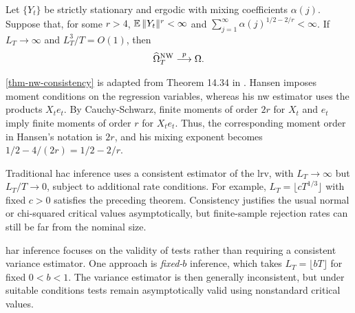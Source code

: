 \documentclass[a4paper,12pt]{article}
\begin{document}
\begin{theorem}\label{thm-nw-consistency}
	Let $\{Y_t\}$ be strictly stationary and ergodic with mixing coefficients $\alpha(j)$.
	Suppose that, for some $r>4$,
	$\operatorname{\mathbb{E}}\|Y_t\|^r<\infty$ and
	$\sum_{j=1}^{\infty}\alpha(j)^{1/2-2/r}<\infty$.
	If $L_T\to\infty$ and $L_T^3/T=O(1)$, then
	\begin{align}
		\widehat\Omega_T^{\mathrm{NW}}\overset{p}{\longrightarrow}\Omega.
	\end{align}
\end{theorem}

\begin{remark}
	\autoref{thm-nw-consistency} is adapted from Theorem 14.34 in \textcite{hansen-econometrics}.
	Hansen imposes moment conditions on the regression variables, whereas his \gls{nw} estimator uses the products $X_te_t$.
	By Cauchy-Schwarz, finite moments of order $2r$ for $X_t$ and $e_t$ imply finite moments of order $r$ for $X_te_t$.
	Thus, the corresponding moment order in Hansen's notation is $2r$, and his mixing exponent becomes $1/2-4/(2r)=1/2-2/r$.
\end{remark}

\begin{remark}
	Traditional \gls{hac} inference uses a consistent estimator of the \gls{lrv},
	with $L_T\to\infty$ but $L_T/T\to0$, subject to additional rate conditions.
	For example, $L_T=\lfloor cT^{1/3}\rfloor$ with fixed $c>0$ satisfies the preceding theorem.
	Consistency justifies the usual normal or chi-squared critical values asymptotically,
	but finite-sample rejection rates can still be far from the nominal size.

	\gls{har} inference focuses on the validity of tests rather than requiring a consistent variance estimator.
	One approach is \emph{fixed-$b$} inference, which takes $L_T=\lfloor bT\rfloor$ for fixed $0<b<1$.
	The variance estimator is then generally inconsistent, but under suitable conditions
	tests remain asymptotically valid using nonstandard critical values.
\end{remark}
\end{document}
